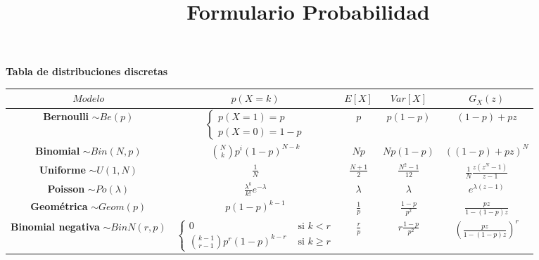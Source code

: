 \documentclass{myclass}
\title{Formulario Probabilidad}
\begin{document}
\maketitle

\textbf{Tabla de distribuciones discretas}
\begin{center}
\begin{tabular}{|c|c|c|c|c|}
\hline
$Modelo$ &  $p(X=k)$ &  $E[X]$ &  $Var[X]$ &  $G_X(z)$ \\
\hline
\makecell{\textbf{Bernoulli}\\ $\sim Be(p)$ }  & $\begin{cases}  p(X=1)=p \\  p(X=0) = 1-p \end{cases}$ & $p$ &  $p(1-p)$ &  $(1-p) + pz$ \\
\hline
\makecell{\textbf{Binomial}\\ $\sim Bin(N, p)$} & $\displaystyle\binom{N}{k}p^i(1-p)^{N-k}$ & $Np$ &  $Np(1-p)$ &  $((1-p)+pz)^N$ \\
\hline
\makecell{\textbf{Uniforme} \\ $\sim U(1, N)$} &  $\displaystyle\frac{1}{N}$ & $\displaystyle\frac{N+1}{2}$ & $\displaystyle\frac{N^2-1}{12}$ & $\displaystyle\frac{1}{N} \frac{z(z^N-1)}{z-1}$ \\
\hline
\makecell{\textbf{Poisson} \\ $\sim Po(\lambda)$} & $\displaystyle\frac{\lambda^k}{k!}e^{-\lambda}$ & $\lambda$ & $\lambda$ & $\displaystyle e^{\lambda(z-1)}$ \\
\hline
\makecell{\textbf{Geométrica} \\ $\sim Geom(p)$} & $\displaystyle p(1-p)^{k-1}$ &  $\displaystyle\frac{1}{p}$ &  $\displaystyle\frac{1-p}{p^2}$ &  $\displaystyle \frac{pz}{1-(1-p)z}$ \\
\hline
\makecell{\textbf{Binomial negativa} \\ $\sim BinN(r, p)$} & $\begin{cases} 0 & \text{ si } k<r \\ \binom{k-1}{r-1}p^r(1-p)^{k-r} & \text{ si } k\ge r \end{cases}$ & $\displaystyle\frac{r}{p}$ & $\displaystyle r \frac{1-p}{p^2}$ & $\displaystyle \left( \frac{pz}{1-(1-p)z} \right)^r $ \\
\hline
\end{tabular}
\end{center}
\end{document}
